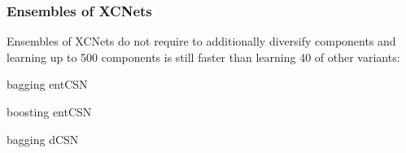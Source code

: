 \documentclass[xcolor={usenames,dvipsnames,svgnames}, compress]{beamer}
\begin{document}
\begin{frame}[t]
  \frametitle{Ensembles of XCNets}
  \small
  Ensembles of XCNets do not require to additionally
diversify components and learning up to 500 components is still faster
than learning 40 of other variants:

\vspace{10pt}

    \begin{center}
      \begin{minipage}{0.9\linewidth}
        \begin{description}[align=parright]
        \item[\textbf{\textsf{CNet}}$_{\mathsf{bag}}$]
          bagging \textsf{entCSN}~\cite{Rahman2016a}\par
        \item[\textbf{\textsf{CNet}}$_{\mathsf{boost}}$]
          boosting \textsf{entCSN}~\cite{Rahman2016a}\par
        \item[\textbf{\textsf{dCSN}}$^{k}$]
          bagging \textsf{dCSN}~\cite{DiMauro2015a,DiMauro2015b}\par
        \end{description}
      \end{minipage}
    \end{center}
\end{frame}
\end{document}
